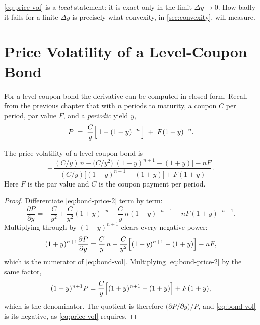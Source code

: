 \begin{note}
	\eqref{eq:price-vol} is a \emph{local} statement: it is exact only in the limit $\Delta y \to 0$.
	How badly it fails for a finite $\Delta y$ is precisely what convexity, in \autoref{sec:convexity}, will measure.
\end{note}
\suppend

\section{Price Volatility of a Level-Coupon Bond}


For a level-coupon bond the derivative can be computed in closed form.
Recall from the previous chapter that with $n$ periods to maturity, a coupon $C$ per period, par value $F$, and a \emph{periodic} yield $y$,
\begin{equation}
	P \;=\; \frac{C}{y}\Bigl[\,1-(1+y)^{-n}\,\Bigr] \;+\; F(1+y)^{-n}. \label{eq:bond-price-2}
\end{equation}

\begin{proposition}
	The price volatility of a level-coupon bond is
	\begin{equation}
		-\,\frac{(C/y)\,n - \bigl(C/y^{2}\bigr)\bigl[(1+y)^{n+1}-(1+y)\bigr] - nF}
		{(C/y)\bigl[(1+y)^{n+1}-(1+y)\bigr] + F(1+y)}\,. \label{eq:bond-vol}
	\end{equation}
	Here $F$ is the par value and $C$ is the coupon payment per period.
\end{proposition}

\suppstart
\begin{proof}
	Differentiate \eqref{eq:bond-price-2} term by term:
	\[
		\frac{\partial P}{\partial y}
		= -\frac{C}{y^{2}} + \frac{C}{y^{2}}(1+y)^{-n} + \frac{C}{y}\,n(1+y)^{-n-1} - nF(1+y)^{-n-1}.
	\]
	Multiplying through by $(1+y)^{n+1}$ clears every negative power:
	\[
		(1+y)^{n+1}\frac{\partial P}{\partial y}
		= \frac{C}{y}\,n - \frac{C}{y^{2}}\Bigl[(1+y)^{n+1}-(1+y)\Bigr] - nF,
	\]
	which is the numerator of \eqref{eq:bond-vol}.
	Multiplying \eqref{eq:bond-price-2} by the same factor,
	\[
		(1+y)^{n+1}P = \frac{C}{y}\Bigl[(1+y)^{n+1}-(1+y)\Bigr] + F(1+y),
	\]
	which is the denominator.
	The quotient is therefore $\bigl(\partial P/\partial y\bigr)/P$, and \eqref{eq:bond-vol} is its negative, as \eqref{eq:price-vol} requires.
\end{proof}

